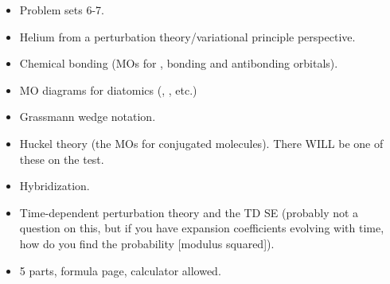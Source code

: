 \documentclass[../notes.tex]{subfiles}
\begin{document}
\begin{itemize}
\begin{itemize}
        \item Problem sets 6-7.
        \item Helium from a perturbation theory/variational principle perspective.
        \item Chemical bonding (MOs for , bonding and antibonding orbitals).
        \item MO diagrams for diatomics (, , etc.)
        \item Grassmann wedge notation.
        \item Huckel theory (the MOs for conjugated molecules). There WILL be one of these on the test.
        \item Hybridization.
        \item Time-dependent perturbation theory and the TD SE (probably not a question on this, but if you have expansion coefficients evolving with time, how do you find the probability [modulus squared]).
        \item 5 parts, formula page, calculator allowed.
    \end{itemize}
\end{itemize}
\end{document}

